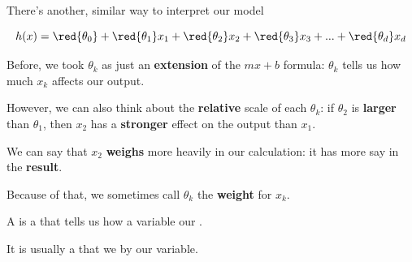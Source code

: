         There's another, similar way to interpret our model
        
        \begin{equation}
            h(x) = \red{\theta_0} + \red{\theta_1}x_1 + \red{\theta_2}x_2 + \red{\theta_3}x_3 + ... + \red{\theta_d}x_d
        \end{equation}
        
        Before, we took $\theta_k$ as just an \textbf{extension} of the $mx+b$ formula: $\theta_k$ tells us how much $x_k$ affects our output.
        
        However, we can also think about the \textbf{relative} scale of each $\theta_k$: if $\theta_2$ is \textbf{larger} than $\theta_1$, then $x_2$ has a \textbf{stronger} effect on the output than $x_1$.
        
        We can say that $x_2$ \textbf{weighs} more heavily in our calculation: it has more say in the \textbf{result}.
        
        Because of that, we sometimes call $\theta_k$ the \textbf{weight} for $x_k$.\\
        
        \begin{definition}
            A  is a  that tells us how  a variable  our .
            
            It is usually a  that we  by our variable.
        \end{definition}

